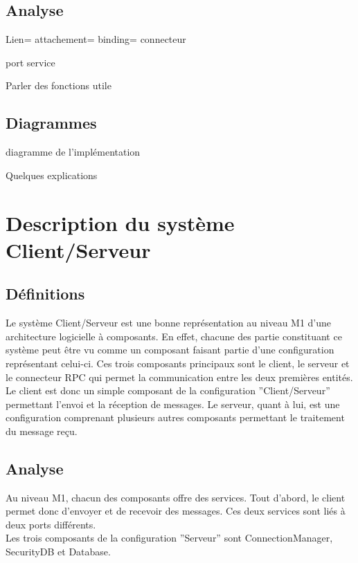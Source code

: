 \documentclass[11pt,a4paper]{article}
\begin{document}
\subsection{Analyse}

Lien= attachement= binding= connecteur

port service

Parler des fonctions utile




\subsection{Diagrammes}

diagramme de l'implémentation

Quelques explications



\clearpage
\section{Description du système Client/Serveur}
\subsection{Définitions}
Le système Client/Serveur est une bonne représentation au niveau M1 d'une
architecture logicielle à composants. En effet, chacune des partie constituant
ce système peut être vu comme un composant faisant partie d'une configuration
représentant celui-ci. Ces trois composants principaux sont le client, le
serveur et le connecteur RPC qui permet la communication entre les deux
premières entités.\\

Le client est donc un simple composant de la configuration ''Client/Serveur''
permettant l'envoi et la réception de messages. Le serveur, quant à lui, est
une configuration comprenant plusieurs autres composants permettant le
traitement du message reçu.


\subsection{Analyse}
Au niveau M1, chacun des composants offre des services. Tout d'abord, le
client permet donc d'envoyer et de recevoir des messages. Ces deux services
sont liés à deux ports différents.\\


Les trois composants de la configuration ''Serveur'' sont ConnectionManager,
SecurityDB et Database.
 
\end{document}
